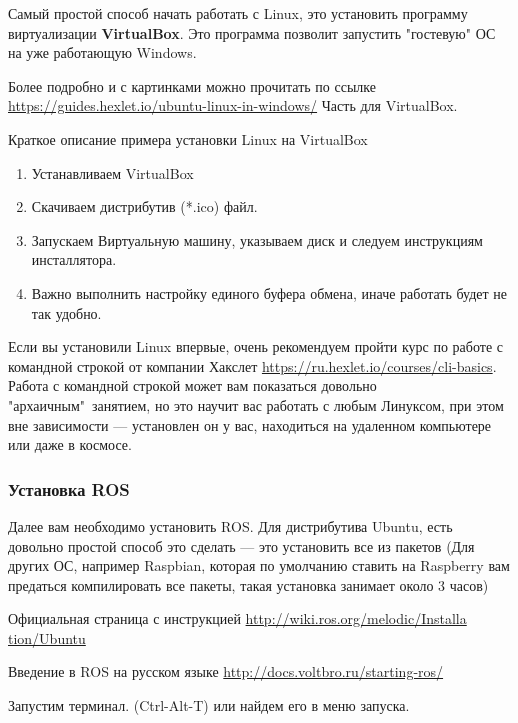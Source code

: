 Самый простой способ начать работать с Linux, это установить программу виртуализации \textbf{VirtualBox}. Это программа позволит запустить "гостевую" ОС на уже работающую Windows.

Более подробно и с картинками можно прочитать по ссылке \url{https://guides.hexlet.io/ubuntu-linux-in-windows/} Часть для VirtualBox.

Краткое описание примера установки Linux на VirtualBox
\begin{enumerate}
    \item Устанавливаем VirtualBox
    \item Скачиваем дистрибутив (*.ico) файл.
    \item Запускаем Виртуальную машину, указываем диск и следуем инструкциям инсталлятора.
    \item Важно выполнить настройку единого буфера обмена, иначе работать будет не так удобно.
\end{enumerate}

Если вы установили Linux впервые, очень рекомендуем пройти курс по работе с командной строкой от компании Хакслет \url{https://ru.hexlet.io/courses/cli-basics}. Работа с командной строкой может вам показаться довольно "архаичным"\ занятием, но это научит вас работать с любым Линуксом, при этом вне зависимости — установлен он у вас, находиться на удаленном компьютере или даже в космосе.

\subsubsection*{Установка ROS}

Далее вам необходимо установить ROS. Для дистрибутива Ubuntu, есть довольно простой способ это сделать — это установить все из пакетов (Для других ОС, например Raspbian, которая по умолчанию ставить на Raspberry вам предаться компилировать все пакеты, такая установка занимает около 3 часов)

Официальная страница с инструкцией \url{http://wiki.ros.org/melodic/Installa} \linebreak \url{tion/Ubuntu}

Введение в ROS на русском языке \url{http://docs.voltbro.ru/starting-ros/}

Запустим терминал. (Ctrl-Alt-T) или найдем его в меню запуска.

